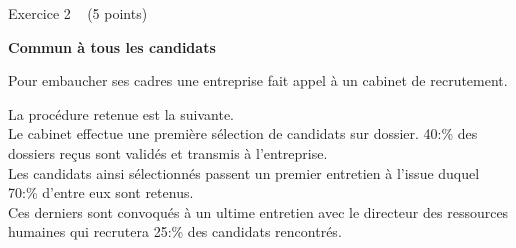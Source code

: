
%
\begin{h3}Exercice 2 ~ (5 points)\end{h3}
\textbf{Commun à tous les candidats}
\par
Pour embaucher ses cadres une entreprise fait appel à un cabinet de recrutement. 
\par
La procédure retenue est la suivante. 
\\Le cabinet effectue une première sélection de candidats sur dossier. 40:\% des dossiers reçus sont validés et transmis à l'entreprise. 
\\Les candidats ainsi sélectionnés passent un premier entretien à l'issue duquel 70:\% d'entre eux sont retenus. 
\\Ces derniers sont convoqués à un ultime entretien avec le directeur des ressources humaines qui recrutera 25:\% des candidats rencontrés.
